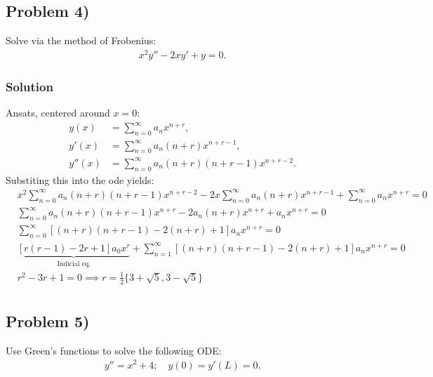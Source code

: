 \subsection*{Problem 4)}
Solve via the method of Frobenius:
\begin{align*}
    x^2y'' -2xy' +y = 0.
\end{align*}

\subsubsection*{Solution}
Ansats, centered around $x = 0$:
\begin{align*}
    y(x) &= \sum_{n = 0}^\infty a_n x^{n + r},\\
    y'(x) &= \sum_{n = 0}^\infty a_n(n+r) x^{n + r - 1},\\
    y''(x) &= \sum_{n = 0}^\infty a_n(n+r)(n+r-1) x^{n + r - 2}.
\end{align*}Substiting this into the ode yields:
\begin{align*}
    &x^2\sum_{n = 0}^\infty a_n(n+r)(n+r-1) x^{n + r - 2} - 2x \sum_{n = 0}^\infty a_n(n+r) x^{n + r - 1} + \sum_{n = 0}^\infty a_n x^{n + r} = 0\\
    &\sum_{n = 0}^\infty a_n(n+r)(n+r-1) x^{n + r} - 2  a_n(n+r) x^{n + r} + a_n x^{n + r} = 0\\
    &\sum_{n = 0}^\infty \left[(n+r)(n+r-1) - 2(n+r) + 1\right]a_n x^{n + r} = 0\\
    &\underbrace{\left[r(r-1)-2r+1\right]a_0x^{r}}_{\text{Indicial eq.}} + \sum_{n = 1}^\infty \left[(n+r)(n+r-1) - 2(n+r) + 1\right]a_n x^{n + r} = 0\\
    & r^2 - 3r + 1 = 0\implies r=\frac{1}{2}\{3 + \sqrt{5},3 - \sqrt{5}\}\\
\end{align*}

\subsection*{Problem 5)}
Use Green's functions to solve the following ODE:
\begin{align*}
    y'' = x^2 + 4;\quad y(0) = y'(L) = 0.
\end{align*}

